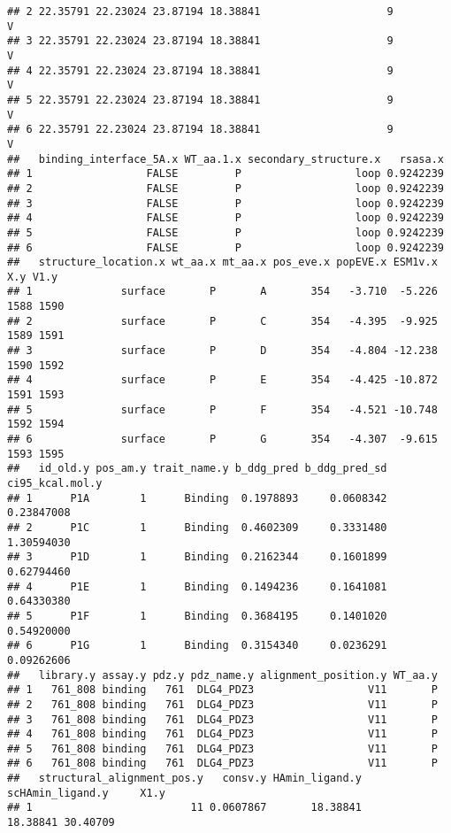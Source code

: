 \documentclass[
]{article}
\begin{document}
\begin{verbatim}
## 2 22.35791 22.23024 23.87194 18.38841                    9                   V
## 3 22.35791 22.23024 23.87194 18.38841                    9                   V
## 4 22.35791 22.23024 23.87194 18.38841                    9                   V
## 5 22.35791 22.23024 23.87194 18.38841                    9                   V
## 6 22.35791 22.23024 23.87194 18.38841                    9                   V
##   binding_interface_5A.x WT_aa.1.x secondary_structure.x   rsasa.x
## 1                  FALSE         P                  loop 0.9242239
## 2                  FALSE         P                  loop 0.9242239
## 3                  FALSE         P                  loop 0.9242239
## 4                  FALSE         P                  loop 0.9242239
## 5                  FALSE         P                  loop 0.9242239
## 6                  FALSE         P                  loop 0.9242239
##   structure_location.x wt_aa.x mt_aa.x pos_eve.x popEVE.x ESM1v.x  X.y V1.y
## 1              surface       P       A       354   -3.710  -5.226 1588 1590
## 2              surface       P       C       354   -4.395  -9.925 1589 1591
## 3              surface       P       D       354   -4.804 -12.238 1590 1592
## 4              surface       P       E       354   -4.425 -10.872 1591 1593
## 5              surface       P       F       354   -4.521 -10.748 1592 1594
## 6              surface       P       G       354   -4.307  -9.615 1593 1595
##   id_old.y pos_am.y trait_name.y b_ddg_pred b_ddg_pred_sd ci95_kcal.mol.y
## 1      P1A        1      Binding  0.1978893     0.0608342      0.23847008
## 2      P1C        1      Binding  0.4602309     0.3331480      1.30594030
## 3      P1D        1      Binding  0.2162344     0.1601899      0.62794460
## 4      P1E        1      Binding  0.1494236     0.1641081      0.64330380
## 5      P1F        1      Binding  0.3684195     0.1401020      0.54920000
## 6      P1G        1      Binding  0.3154340     0.0236291      0.09262606
##   library.y assay.y pdz.y pdz_name.y alignment_position.y WT_aa.y
## 1   761_808 binding   761  DLG4_PDZ3                  V11       P
## 2   761_808 binding   761  DLG4_PDZ3                  V11       P
## 3   761_808 binding   761  DLG4_PDZ3                  V11       P
## 4   761_808 binding   761  DLG4_PDZ3                  V11       P
## 5   761_808 binding   761  DLG4_PDZ3                  V11       P
## 6   761_808 binding   761  DLG4_PDZ3                  V11       P
##   structural_alignment_pos.y   consv.y HAmin_ligand.y scHAmin_ligand.y     X1.y
## 1                         11 0.0607867       18.38841         18.38841 30.40709

\end{verbatim}
\end{document}
